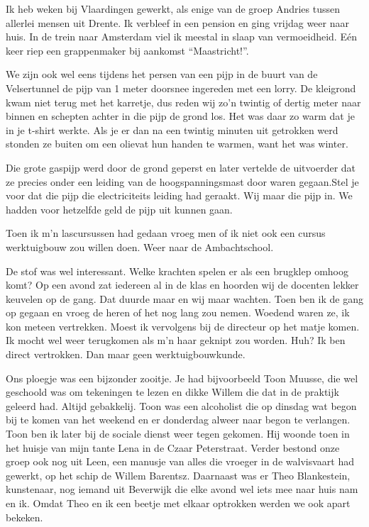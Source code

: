 \documentclass[10pt,twoside, openright]{memoir}
\begin{document}
Ik heb weken bij Vlaardingen gewerkt, als enige van de groep Andries tussen allerlei mensen uit Drente. Ik verbleef in een pension en ging vrijdag weer naar huis. In de trein naar Amsterdam viel ik meestal in slaap van vermoeidheid. Eén keer riep een grappenmaker bij aankomst ``Maastricht!''. 

We zijn ook wel eens tijdens het persen van een pijp in de buurt van de Velsertunnel de pijp van 1 meter doorsnee ingereden met een lorry. De kleigrond kwam niet terug met het karretje, dus reden wij zo'n twintig of dertig meter naar binnen en schepten achter in die pijp de grond los. Het was daar zo warm dat je in je t-shirt werkte. Als je er dan na een twintig minuten uit getrokken werd stonden ze buiten om een olievat hun handen te warmen, want het was winter. 

Die grote gaspijp werd door de grond geperst en later vertelde de uitvoerder dat ze precies onder een leiding van de hoogspanningsmast door waren gegaan.Stel je voor dat die pijp die electriciteits leiding had geraakt. Wij maar die pijp in. We hadden voor hetzelfde geld de pijp uit kunnen gaan.

Toen ik m’n lascursussen had gedaan vroeg men of ik niet ook een cursus werktuigbouw zou willen doen. Weer naar de Ambachtschool. 

De stof was wel interessant. Welke krachten spelen er als een brugklep omhoog komt? Op een avond zat iedereen al in de klas en hoorden wij de docenten lekker keuvelen op de gang. Dat duurde maar en wij maar wachten. Toen ben ik de gang op gegaan en vroeg de heren of het nog lang zou nemen. Woedend waren ze, ik kon meteen vertrekken. Moest ik vervolgens bij de directeur op het matje komen. Ik mocht wel weer terugkomen als m’n haar geknipt zou worden. Huh? Ik ben direct vertrokken. Dan maar geen werktuigbouwkunde.

Ons ploegje was een bijzonder zooitje. Je had bijvoorbeeld Toon Muusse, die wel geschoold was om tekeningen te lezen en dikke Willem die dat in de praktijk geleerd had. Altijd gebakkelij. Toon was een alcoholist die op dinsdag wat begon bij te komen van het weekend en er donderdag alweer naar begon te verlangen. Toon ben ik later bij de sociale dienst weer tegen gekomen. Hij woonde toen in het huisje van mijn tante Lena in de Czaar Peterstraat. Verder bestond onze groep ook nog uit Leen, een manusje van alles die vroeger in de walvisvaart had gewerkt, op het schip de Willem Barentsz. Daarnaast was er Theo Blankestein, kunstenaar, nog iemand uit Beverwijk die elke avond wel iets mee naar huis nam en ik. Omdat Theo en ik een beetje met elkaar optrokken werden we ook apart bekeken. 
\end{document}
